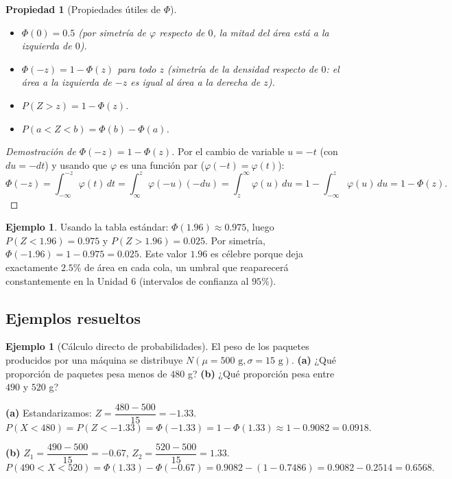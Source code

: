 \documentclass[11pt,a4paper]{article}
\theoremstyle{plain}
\newtheorem{propiedad}[teorema]{Propiedad}
\theoremstyle{definition}
\newtheorem{ejemplo}[teorema]{Ejemplo}
\theoremstyle{remark}
\begin{document}
\begin{propiedad}[Propiedades útiles de $\Phi$]
\begin{itemize}
\item $\Phi(0)=0.5$ (por simetría de $\varphi$ respecto de $0$, la mitad del área está a la izquierda de $0$).
\item $\Phi(-z)=1-\Phi(z)$ para todo $z$ (simetría de la densidad respecto de $0$: el área a la izquierda de $-z$ es igual al área a la derecha de $z$).
\item $P(Z>z)=1-\Phi(z)$.
\item $P(a<Z<b)=\Phi(b)-\Phi(a)$.
\end{itemize}
\end{propiedad}
\begin{proof}[Demostración de $\Phi(-z)=1-\Phi(z)$]
Por el cambio de variable $u=-t$ (con $du=-dt$) y usando que $\varphi$ es una función par ($\varphi(-t)=\varphi(t)$):
$$\Phi(-z)=\int_{-\infty}^{-z}\varphi(t)\,dt=\int_{\infty}^{z}\varphi(-u)(-du)=\int_z^\infty\varphi(u)\,du=1-\int_{-\infty}^z\varphi(u)\,du=1-\Phi(z).$$
\end{proof}

\begin{ejemplo}
Usando la tabla estándar: $\Phi(1.96)\approx0.975$, luego $P(Z<1.96)=0.975$ y $P(Z>1.96)=0.025$. Por simetría, $\Phi(-1.96)=1-0.975=0.025$. Este valor $1.96$ es célebre porque deja exactamente $2.5\%$ de área en cada cola, un umbral que reaparecerá constantemente en la Unidad 6 (intervalos de confianza al $95\%$).
\end{ejemplo}

\subsection{Ejemplos resueltos}

\begin{ejemplo}[Cálculo directo de probabilidades]
El peso de los paquetes producidos por una máquina se distribuye $N(\mu=500\text{ g},\sigma=15\text{ g})$.
\textbf{(a)} ¿Qué proporción de paquetes pesa menos de $480$ g?
\textbf{(b)} ¿Qué proporción pesa entre $490$ y $520$ g?

\textbf{(a)} Estandarizamos: $Z=\dfrac{480-500}{15}=-1.33$.
$$P(X<480)=P(Z<-1.33)=\Phi(-1.33)=1-\Phi(1.33)\approx1-0.9082=0.0918.$$

\textbf{(b)} $Z_1=\dfrac{490-500}{15}=-0.67$, $Z_2=\dfrac{520-500}{15}=1.33$.
$$P(490<X<520)=\Phi(1.33)-\Phi(-0.67)=0.9082-(1-0.7486)=0.9082-0.2514=0.6568.$$
\end{ejemplo}
\end{document}
